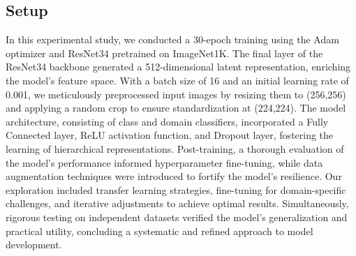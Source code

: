 \documentclass[nonacm, sigconf]{acmart}
\begin{document}
\subsection{Setup}
In this experimental study, we conducted a 30-epoch training using the Adam optimizer and ResNet34 pretrained on ImageNet1K. The final layer of the ResNet34 backbone generated a 512-dimensional latent representation, enriching the model's feature space. With a batch size of 16 and an initial learning rate of 0.001, we meticulously preprocessed input images by resizing them to (256,256) and applying a random crop to ensure standardization at (224,224). The model architecture, consisting of class and domain classifiers, incorporated a Fully Connected layer, ReLU activation function, and Dropout layer, fostering the learning of hierarchical representations. Post-training, a thorough evaluation of the model's performance informed hyperparameter fine-tuning, while data augmentation techniques were introduced to fortify the model's resilience. Our exploration included transfer learning strategies, fine-tuning for domain-specific challenges, and iterative adjustments to achieve optimal results. Simultaneously, rigorous testing on independent datasets verified the model's generalization and practical utility, concluding a systematic and refined approach to model development.
\end{document}
